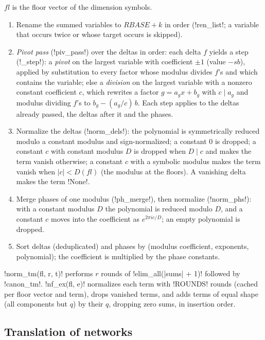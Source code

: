 {{{\begin{algorithm}\label{alg:lean-export-sym-canon}
$fl$ is the floor vector of the dimension symbols.
\begin{enumerate}
\item Rename the summed variables to $\mathit{RBASE}+k$ in order (\lexpy!ren_list!; a variable that
occurs twice or whose target occurs is skipped).
\item \emph{Pivot pass} (\lexpy!piv_pass!) over the deltas in order: each delta $f$ yields a step
(\lexpy!_step!): a \emph{pivot} on the largest variable with coefficient $\pm1$ (value $-sb$),
applied by substitution to every factor whose modulus divides $f$'s and which contains the
variable; else a \emph{division} on the largest variable with a nonzero constant coefficient
$c$, which rewrites a factor $g = a_g x + b_g$ with $c \mid a_g$ and modulus dividing $f$'s to
$b_g - (a_g/c)\,b$. Each step applies to the deltas already passed, the deltas after it and the
phases.
\item Normalize the deltas (\lexpy!norm_dels!): the polynomial is symmetrically reduced modulo a
constant modulus and sign-normalized; a constant $0$ is dropped; a constant $c$ with constant
modulus $D$ is dropped when $D\mid c$ and makes the term vanish otherwise; a constant $c$ with a
symbolic modulus makes the term vanish when $|c| < D(fl)$ (the modulus at the floors). A
vanishing delta makes the term \lexpy!None!.
\item Merge phases of one modulus (\lexpy!ph_merge!), then normalize (\lexpy!norm_phs!): with a
constant modulus $D$ the polynomial is reduced modulo $D$, and a constant $c$ moves into the
coefficient as $e^{2\pi i c/D}$; an empty polynomial is dropped.
\item Sort deltas (deduplicated) and phases by (modulus coefficient, exponents, polynomial); the
coefficient is multiplied by the phase constants.
\end{enumerate}
\lexpy!norm_tm(fl, r, t)! performs $r$ rounds of \lexpy!elim_all(|sums| + 1)! followed by
\lexpy!canon_tm!. \lexpy!nf_ex(fl, e)! normalizes each term with \lexpy!ROUNDS! rounds (cached per floor
vector and term), drops vanished terms, and adds terms of equal shape (all components but $q$)
by their $q$, dropping zero sums, in insertion order.
\end{algorithm}

\subsection{Translation of networks}\label{sec:lean-export-sym-translate}

}}}
